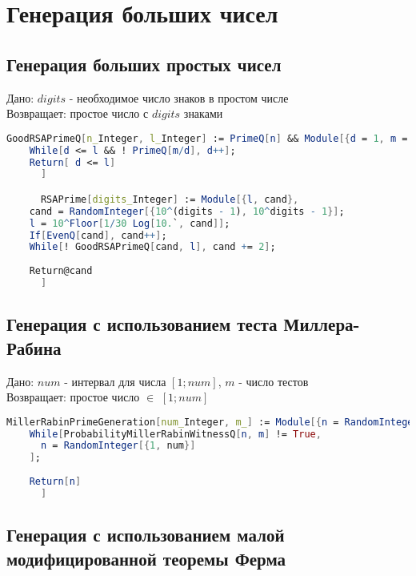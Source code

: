 \chapter{Генерация больших чисел}

  \section{Генерация больших простых чисел}

    Дано: {$digits$} - необходимое число знаков в простом числе \\
    Возвращает: простое число с  {$digits$} знаками

    \begin{lstlisting}[language=Mathematica,caption={
      Генерация больших простых чисел
    }]
      GoodRSAPrimeQ[n_Integer, l_Integer] := PrimeQ[n] && Module[{d = 1, m = (n - 1)/2},
	While[d <= l && ! PrimeQ[m/d], d++];
	Return[ d <= l]
      ]

      RSAPrime[digits_Integer] := Module[{l, cand},
	cand = RandomInteger[{10^(digits - 1), 10^digits - 1}];
	l = 10^Floor[1/30 Log[10.`, cand]];
	If[EvenQ[cand], cand++];
	While[! GoodRSAPrimeQ[cand, l], cand += 2];
	
	Return@cand
      ]

    \end{lstlisting}

  \section{Генерация с использованием теста Миллера-Рабина}

    Дано: {$num$} - интервал для числа {$[1;num]$}, {$m$} - число тестов \\
    Возвращает: простое число {$\in$} {$[1;num]$}

    \begin{lstlisting}[language=Mathematica,caption={
      Генерация с использованием теста Миллера-Рабина  
    }]
      MillerRabinPrimeGeneration[num_Integer, m_] := Module[{n = RandomInteger[{1, num}]},
	While[ProbabilityMillerRabinWitnessQ[n, m] != True, 
	  n = RandomInteger[{1, num}]
	];
      
	Return[n]
      ]
    \end{lstlisting}

  \section{Генерация с использованием малой модифицированной теоремы Ферма}

